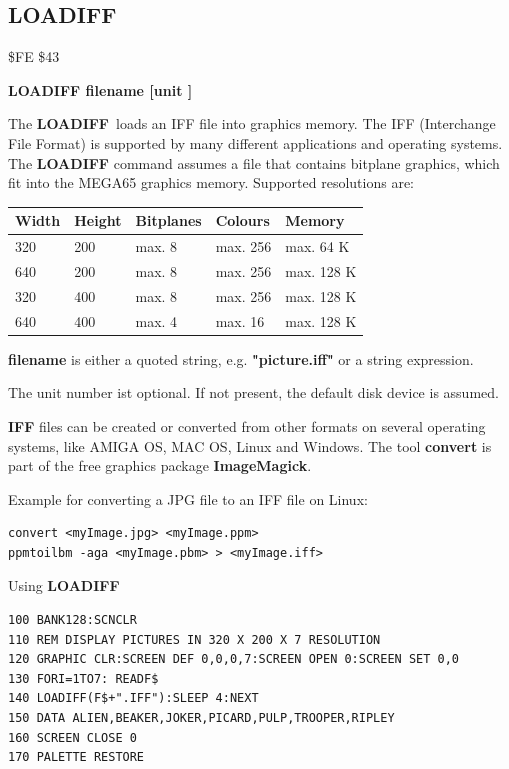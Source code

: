 \subsection{LOADIFF}
\begin{description}[leftmargin=2cm,style=nextline]
\item [Token:] \$FE \$43
\item [Format:] {\bf LOADIFF filename [unit ]}
\item [Usage:]

   The {\bf LOADIFF} loads an IFF file into graphics memory.
   The IFF (Interchange File Format) is supported by many different applications
   and operating systems. The {\bf LOADIFF} command assumes a file
   that contains bitplane graphics, which fit into the MEGA65 graphics memory.
   Supported resolutions are:

{\ttfamily
\setlength{\tabcolsep}{1mm}
\begin{tabular}{|l|l|l|l|l|}
\hline
 Width             & Height & Bitplanes & Colours & Memory \\
\hline
320                     &  200    & max. 8     & max. 256 & max. 64 K \\
640                     &  200    & max. 8     & max. 256 & max. 128 K \\
320                     &  400    & max. 8     & max. 256 & max. 128 K \\
640                     &  400    & max. 4     & max.  16 & max. 128 K \\
\hline
\end{tabular}
}

   {\bf filename} is either a quoted string, e.g. {\bf "picture.iff"} or
   a string expression.

   The unit number ist optional.
   If not present, the default disk device is assumed.

\item [Remarks:]
   {\bf IFF} files can be created or converted from other formats on
   several operating systems, like AMIGA OS, MAC OS, Linux and Windows.
   The tool {\bf convert} is part of the free graphics package {\bf ImageMagick}.

Example for converting a JPG file to an IFF file on Linux:

\begin{verbatim}
convert <myImage.jpg> <myImage.ppm>
ppmtoilbm -aga <myImage.pbm> > <myImage.iff>
\end{verbatim}

\item [Example:] Using {\bf LOADIFF}
\begin{tcolorbox}[colback=black,coltext=white]
\verbatimfont{\codefont}
\begin{verbatim}
100 BANK128:SCNCLR
110 REM DISPLAY PICTURES IN 320 X 200 X 7 RESOLUTION
120 GRAPHIC CLR:SCREEN DEF 0,0,0,7:SCREEN OPEN 0:SCREEN SET 0,0
130 FORI=1TO7: READF$
140 LOADIFF(F$+".IFF"):SLEEP 4:NEXT
150 DATA ALIEN,BEAKER,JOKER,PICARD,PULP,TROOPER,RIPLEY
160 SCREEN CLOSE 0
170 PALETTE RESTORE
\end{verbatim}
\end{tcolorbox}
\end{description}

